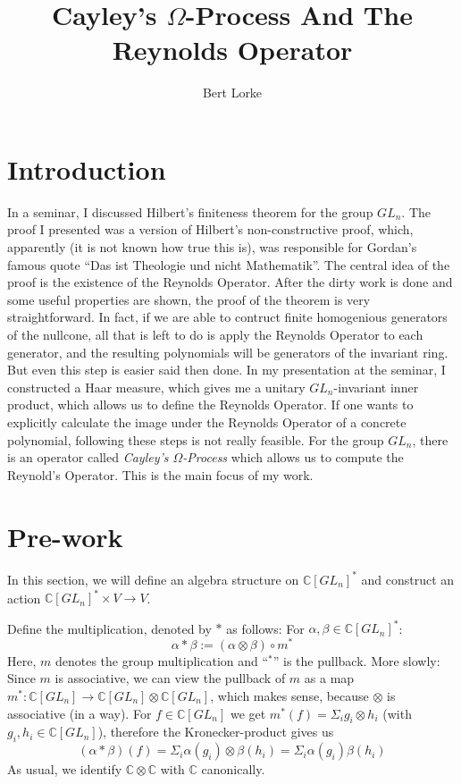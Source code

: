\documentclass{article}
\title{Cayley's $\Omega$-Process And The Reynolds Operator}
\author{Bert Lorke}
\begin{document}
\maketitle

\section{Introduction}

In a seminar, I discussed Hilbert's finiteness theorem for the group $GL_n$.
The proof I presented was a version of Hilbert's non-constructive proof, which, apparently (it is not known how true this is), was responsible for Gordan's famous quote ``Das ist Theologie und nicht Mathematik''.
The central idea of the proof is the existence of the Reynolds Operator.
After the dirty work is done and some useful properties are shown, the proof of the theorem is very straightforward.
In fact, if we are able to contruct finite homogenious generators of the nullcone, all that is left to do is apply the Reynolds Operator to each generator, and the resulting polynomials will be generators of the invariant ring.
But even this step is easier said then done.
In my presentation at the seminar, I constructed a Haar measure, which gives me a unitary $GL_n$-invariant inner product, which allows us to define the Reynolds Operator. If one wants to explicitly calculate the image under the Reynolds Operator of a concrete polynomial, following these steps is not really feasible.
For the group $GL_n$, there is an operator called \textit{Cayley's $\Omega$-Process} which allows us to compute the Reynold's Operator.
This is the main focus of my work.

\section{Pre-work}
In this section, we will define an algebra structure on $\mathbb{C}[GL_n]^\ast$ and construct an action $\mathbb{C}[GL_n]^\ast \times V \longrightarrow V$.

\bigskip
Define the multiplication, denoted by $\ast$ as follows:  For $\alpha, \beta \in \mathbb{C}[GL_n]^\ast$:  
\begin{equation}
  \alpha \ast \beta := \left( \alpha \otimes \beta \right) \circ m^\ast
\end{equation}
Here, $m$ denotes the group multiplication and ``$^\ast$'' is the pullback.
More slowly: Since $m$ is associative, we can view the pullback of $m$ as a map $m^\ast : \mathbb{C}[GL_n] \longrightarrow \mathbb{C}[GL_n] \otimes \mathbb{C}[GL_n]$, which makes sense, because $\otimes$ is associative (in a way).
For $f \in \mathbb{C}[GL_n]$ we get $m^\ast \left( f \right) = \Sigma_i g_i \otimes h_i$ (with $g_i , h_i \in \mathbb{C}[GL_n]$), therefore the Kronecker-product gives us
\begin{equation}
  \left( \alpha \ast \beta \right) \left( f \right) = \Sigma_i \alpha \left( g_i \right) \otimes \beta \left( h_i \right) = \Sigma_i \alpha \left( g_i \right) \beta \left( h_i \right)
\end{equation}
As usual, we identify $\mathbb{C} \otimes \mathbb{C}$ with $\mathbb{C}$ canonically.  
\end{document}
